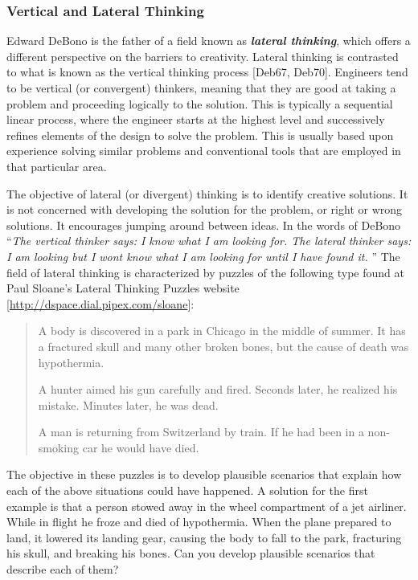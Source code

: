 \subsubsection{Vertical and Lateral
Thinking}\label{vertical-and-lateral-thinking}

Edward DeBono is the father of a field known as \emph{\textbf{lateral
thinking}}, which offers a different per­spective on the barriers to
creativity. Lateral thinking is contrasted to what is known as the
vertical thinking process {[}Deb67, Deb70{]}. Engineers tend to be
vertical (or convergent) think­ers, meaning that they are good at taking
a problem and proceeding logically to the solution. This is typically a
sequential linear process, where the engineer starts at the highest
level and successively refines elements of the design to solve the
problem. This is usually based upon experience solving similar problems
and conventional tools that are employed in that par­ticular area.

The objective of lateral (or divergent) thinking is to identify creative
solutions. It is not concerned with developing the solution for the
problem, or right or wrong solutions. It encourages jumping around
be­tween ideas. In the words of DeBono ``\emph{The vertical thinker says:
\textquotesingle I know what I am looking for.\textquotesingle{} The
lateral thinker says: \textquotesingle I am looking but I
won\textquotesingle t know what I am looking for until I have found
it.\textquotesingle{}} '' The field of lateral thinking is characterized
by puzzles of the following type found at Paul Sloane's Lateral Thinking
Puzzles website {[}\url{http://dspace.dial.pipex.com/sloane}{]}:

\begin{quote}
A body is discovered in a park in Chicago in the middle of summer. It
has a fractured skull and many other broken bones, but the cause of
death was hypothermia.

A hunter aimed his gun carefully and fired. Seconds later, he realized
his mistake. Minutes later, he was dead.

A man is returning from Switzerland by train. If he had been in a
non-smoking car he would have died.
\end{quote}

The objective in these puzzles is to develop plausible scenarios that
explain how each of the above situations could have happened. A solution
for the first example is that a person stowed away in the wheel
compartment of a jet airliner. While in flight he froze and died of
hypo­thermia. When the plane prepared to land, it lowered its landing
gear, causing the body to fall to the park, fracturing his skull, and
breaking his bones. Can you develop plausible scenarios that describe
each of them?

